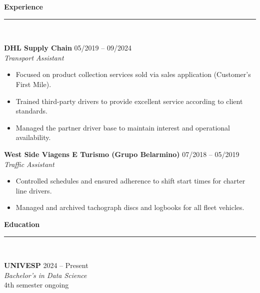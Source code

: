 \documentclass[10pt,a4paper]{article}
\begin{document}
\begin{minipage}[t]{0.63\textwidth}
    \raggedright
    
    {\color{primarycolor}\large \textbf{Experience}} \\
    \rule{\linewidth}{0.5pt} \\
    \vspace{2mm}
    
            \textbf{DHL Supply Chain} \hfill \small 05/2019 -- 09/2024 \\
        \textit{\small Transport Assistant}
        \begin{itemize}
                                        \item \small Focused on product collection services sold via sales application (Customer's First Mile).
                            \item \small Trained third-party drivers to provide excellent service according to client standards.
                            \item \small Managed the partner driver base to maintain interest and operational availability.
                    \end{itemize}
        \vspace{2mm}
            \textbf{West Side Viagens E Turismo (Grupo Belarmino)} \hfill \small 07/2018 -- 05/2019 \\
        \textit{\small Traffic Assistant}
        \begin{itemize}
                                        \item \small Controlled schedules and ensured adherence to shift start times for charter line drivers.
                            \item \small Managed and archived tachograph discs and logbooks for all fleet vehicles.
                    \end{itemize}
        \vspace{2mm}
        
    \vspace{3mm}
    
    {\color{primarycolor}\large \textbf{Education}} \\
    \rule{\linewidth}{0.5pt} \\
    \vspace{2mm}
    
            \textbf{UNIVESP} \hfill \small 2024 -- Present \\
        \textit{\small Bachelor's in Data Science} \\
        \small 4th semester ongoing \\
        \vspace{2mm}
    \end{minipage}
\end{document}
